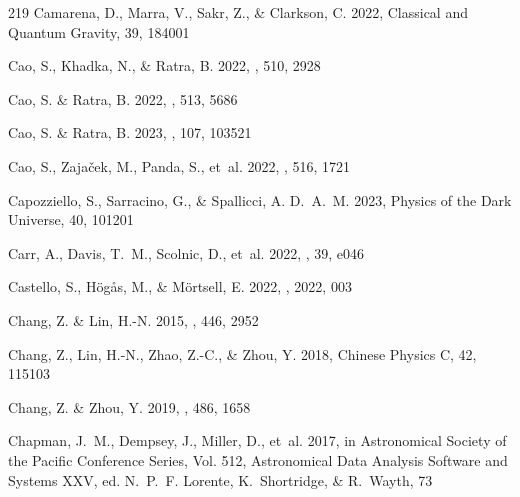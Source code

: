 \documentclass{aa}
\begin{document}
\begin{thebibliography}{219}
	{Camarena}, D., {Marra}, V., {Sakr}, Z., \& {Clarkson}, C. 2022, Classical and Quantum Gravity, 39, 184001
	
	{Cao}, S., {Khadka}, N., \& {Ratra}, B. 2022{}, \mnras, 510, 2928
	
	{Cao}, S. \& {Ratra}, B. 2022, \mnras, 513, 5686
	
	{Cao}, S. \& {Ratra}, B. 2023, \prd, 107, 103521
	
	{Cao}, S., {Zaja{\v{c}}ek}, M., {Panda}, S., {et~al.} 2022{}, \mnras, 516, 1721
	
	{Capozziello}, S., {Sarracino}, G., \& {Spallicci}, A. D.~A.~M. 2023, Physics of the Dark Universe, 40, 101201
	
	{Carr}, A., {Davis}, T.~M., {Scolnic}, D., {et~al.} 2022, \pasa, 39, e046
	
	{Castello}, S., {H{\"o}g{\r{a}}s}, M., \& {M{\"o}rtsell}, E. 2022, \jcap, 2022, 003
	
	{Chang}, Z. \& {Lin}, H.-N. 2015, \mnras, 446, 2952
	
	{Chang}, Z., {Lin}, H.-N., {Zhao}, Z.-C., \& {Zhou}, Y. 2018, Chinese Physics C, 42, 115103
	
	{Chang}, Z. \& {Zhou}, Y. 2019, \mnras, 486, 1658
	
	{Chapman}, J.~M., {Dempsey}, J., {Miller}, D., {et~al.} 2017, in Astronomical Society of the Pacific Conference Series, Vol. 512, Astronomical Data Analysis Software and Systems XXV, ed. N.~P.~F. {Lorente}, K.~{Shortridge}, \& R.~{Wayth}, 73
	

\end{thebibliography}
\end{document}
